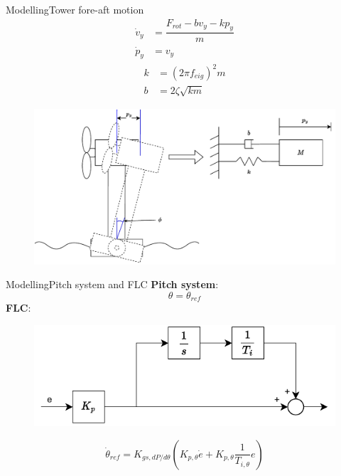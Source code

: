 \begin{frame}{Modelling}{Tower fore-aft motion}
	\begin{equation}
		\begin{split}
			\dot{v}_y & = \dfrac{F_{rot} - b v_y - k p_y}{m} \\
			\dot{p}_y & = v_y
		\end{split}
	\end{equation}
	\begin{equation}
		\begin{split}
			k & = (2 \pi f_{eig})^2 m \\
			b & = 2 \zeta \sqrt{k m}
		\end{split}
	\end{equation}
	\begin{figure}[ht]
		\centering
		\includegraphics[width=0.9\linewidth]{../Graphics/wtLinForeAftMotionModel.pdf}
		\label{fig:wtLin_fore-aft_diagram}
	\end{figure}
\end{frame}


\begin{frame}{Modelling}{Pitch system and FLC}
	\textbf{Pitch system}:
	\begin{equation}\label{eq:comp_pitch_freq}
		\theta = \theta_{ref}
	\end{equation}
	\textbf{FLC}:
	\begin{figure}[ht]
		\centering
		\includegraphics[width=0.65\linewidth]{../Graphics/PiController.pdf}
		\label{fig:PIcontroller}
	\end{figure}
	\begin{equation}\label{eq:comp_flc_time}
		\dot{\theta}_{ref} = K_{gs,dP/d\theta} (K_{p, \theta} \dot{e} + K_{p, \theta} \dfrac{1}{T_{i, \theta}} e)
	\end{equation}

\end{frame}

